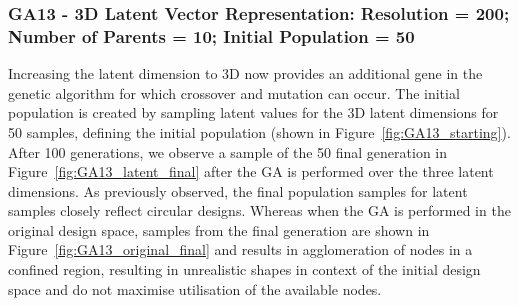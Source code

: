 \documentclass{article}
\begin{document}
\subsubsection*{GA13 - 3D Latent Vector Representation: Resolution = 200; Number of Parents = 10; Initial Population = 50}

Increasing the latent dimension to 3D now provides an additional gene in the genetic algorithm for which crossover and mutation can occur. The initial population is created by sampling latent values for the 3D latent dimensions for 50 samples, defining the initial population (shown in Figure~\ref{fig:GA13_starting}). After 100 generations, we observe a sample of the 50 final generation in Figure~\ref{fig:GA13_latent_final} after the GA is performed over the three latent dimensions. As previously observed, the final population samples for latent samples closely reflect circular designs. Whereas when the GA is performed in the original design space, samples from the final generation are shown in Figure~\ref{fig:GA13_original_final} and results in agglomeration  of nodes in a confined region, resulting in unrealistic shapes in context of the initial design space and do not maximise utilisation of the available nodes.
\end{document}
